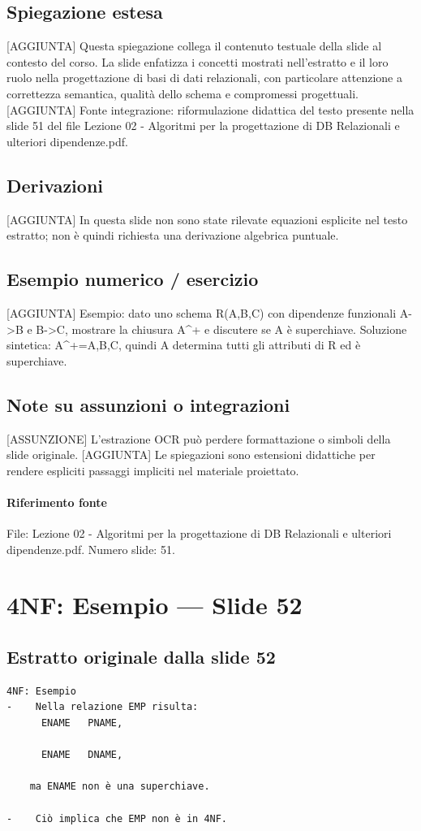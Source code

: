 \documentclass[11pt]{article}
\begin{document}
\subsection*{Spiegazione estesa}
[AGGIUNTA] Questa spiegazione collega il contenuto testuale della slide al contesto del corso. La slide enfatizza i concetti mostrati nell'estratto e il loro ruolo nella progettazione di basi di dati relazionali, con particolare attenzione a correttezza semantica, qualità dello schema e compromessi progettuali.
[AGGIUNTA] Fonte integrazione: riformulazione didattica del testo presente nella slide 51 del file Lezione 02 - Algoritmi per la progettazione di DB Relazionali e ulteriori dipendenze.pdf.
\subsection*{Derivazioni}
[AGGIUNTA] In questa slide non sono state rilevate equazioni esplicite nel testo estratto; non è quindi richiesta una derivazione algebrica puntuale.
\subsection*{Esempio numerico / esercizio}
[AGGIUNTA] Esempio: dato uno schema R(A,B,C) con dipendenze funzionali A->B e B->C, mostrare la chiusura A^+ e discutere se A è superchiave. Soluzione sintetica: A^+={A,B,C}, quindi A determina tutti gli attributi di R ed è superchiave.
\subsection*{Note su assunzioni o integrazioni}
[ASSUNZIONE] L'estrazione OCR può perdere formattazione o simboli della slide originale.
[AGGIUNTA] Le spiegazioni sono estensioni didattiche per rendere espliciti passaggi impliciti nel materiale proiettato.
\paragraph{Riferimento fonte} File: Lezione 02 - Algoritmi per la progettazione di DB Relazionali e ulteriori dipendenze.pdf. Numero slide: 51.
\section{4NF: Esempio --- Slide 52}
\subsection*{Estratto originale dalla slide 52}
\begin{lstlisting}
4NF: Esempio
-    Nella relazione EMP risulta:
      ENAME   PNAME,

      ENAME   DNAME,

    ma ENAME non è una superchiave.

-    Ciò implica che EMP non è in 4NF.
\end{lstlisting}
\end{document}
